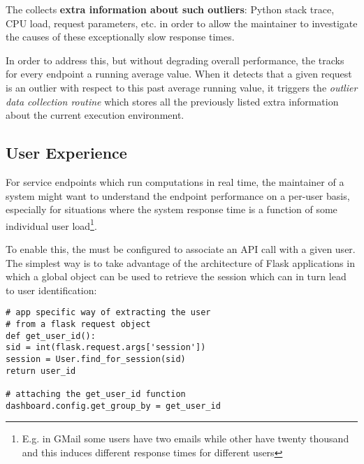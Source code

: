 \documentclass{sig-alternate-05-2015}
\begin{document}
  \niceseparator


  The \tool collects {\bf extra information about such outliers}: Python stack trace, CPU load, request parameters, etc. in order to allow the maintainer to investigate the causes of these exceptionally slow response times. 

  In order to address this, but without degrading overall performance, the \tool tracks for every endpoint a running average value. When it detects that a given request is an outlier with respect to this past average running value, it triggers the {\em outlier data collection routine} which stores all the previously listed extra information about the current execution environment. 

\subsection{User Experience}
\label{sec:user}

For service endpoints which run computations in real time, the maintainer of a system might want to understand the endpoint performance on a per-user basis, especially for situations where the system response time is a function of some individual user load\footnote{E.g. in GMail some users have two emails while other have twenty thousand and this induces different response times for different users}.

To enable this, the \tool must be configured to associate an API call with a given user. The simplest way is to take advantage of the architecture of Flask applications in which a global  object can be used to retrieve the session which can in turn lead to user identification: 

\begin{lstlisting}[style=custompython]  
# app specific way of extracting the user
# from a flask request object    
def get_user_id():
sid = int(flask.request.args['session'])
session = User.find_for_session(sid)
return user_id

# attaching the get_user_id function
dashboard.config.get_group_by = get_user_id

\end{lstlisting}
\end{document}
